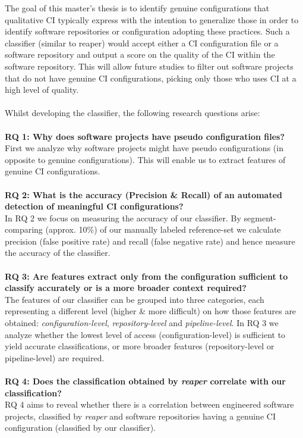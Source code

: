 \documentclass{task_description}
\begin{document}
The goal of this master's thesis is to identify genuine configurations that qualitative CI typically express with the intention to generalize those in order to identify software repositories or configuration adopting these practices. Such a classifier (similar to reaper) would accept either a CI configuration file or a software repository and output a score on the quality of the CI within the software repository. This will allow future studies to filter out software projects that do not have genuine CI configurations, picking only those who uses CI at a high level of quality.
\\\\
Whilst developing the classifier, the following research questions arise:
\\\\
\textbf{RQ 1: Why does software projects have pseudo configuration files?}\\
First we analyze why software projects might have pseudo configurations (\ie in opposite to genuine configurations). This will enable us to extract features of genuine CI configurations.
\\\\
\textbf{RQ 2: What is the accuracy (Precision \& Recall) of an automated detection of meaningful CI configurations?}\\
In RQ 2 we focus on measuring the accuracy of our classifier. By segment-comparing (approx. 10\%) of our manually labeled reference-set we calculate precision (false positive rate) and recall (false negative rate) and hence measure the accuracy of the classifier.
\\\\
\textbf{RQ 3: Are features extract only from the configuration sufficient to classify accurately or is a more broader context required?}\\
The features of our classifier can be grouped into three categories, each representing a different level (\ie higher \& more difficult) on how those features are obtained: \textit{configuration-level}, \textit{repository-level} and \textit{pipeline-level}. In RQ 3 we analyze whether the lowest level of access (configuration-level) is sufficient to yield accurate classifications, or more broader features (repository-level or pipeline-level) are required.
\\\\
\textbf{RQ 4: Does the classification obtained by \textit{reaper} correlate with our classification?}\\
RQ 4 aims to reveal whether there is a correlation between engineered software projects, classified by \textit{reaper} and software repositories having a genuine CI configuration (classified by our classifier).
\end{document}
